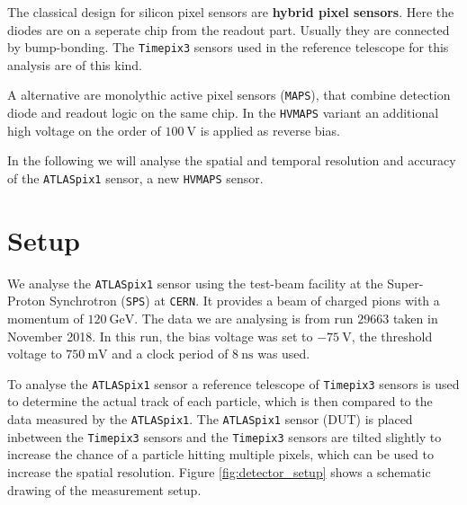 \documentclass[twocolumn,DIV=14,a4paper,biblatex, 10pt]{scrartcl}
\newcommand{\atlaspix}{\texttt{ATLASpix1}\xspace}
\newcommand{\timepix}{\texttt{Timepix3}\xspace}
\begin{document}
The classical design for silicon pixel sensors are \textbf{hybrid pixel sensors}. Here the diodes are on a seperate chip from the readout part. Usually they are connected by bump-bonding. The \timepix sensors used in the reference telescope for this analysis are of this kind.

A alternative are monolythic active pixel sensors (\texttt{MAPS}), that combine detection diode and readout logic on the same chip. In the \texttt{HVMAPS} variant an additional high voltage on the order of $\SI{100}{\volt}$ is applied as reverse bias.

In the following we will analyse the spatial and temporal resolution and accuracy of the \atlaspix sensor, a new \texttt{HVMAPS} sensor.
\section{Setup}
We analyse the \atlaspix sensor using the test-beam facility at the Super-Proton Synchrotron (\texttt{SPS}) at \texttt{CERN}. It provides a beam of charged pions with a momentum of $\SI{120}{\giga\electronvolt}$. The data we are analysing is from run $\num{29663}$ taken in November 2018. In this run, the bias voltage was set to $\SI{-75}{\volt}$, the threshold voltage to $\SI{750}{\milli\volt}$ and a clock period of $\SI{8}{\nano\second}$ was used.

To analyse the \atlaspix sensor a reference telescope of \timepix sensors is used to determine the actual track of each particle, which is then compared to the data measured by the \atlaspix. The \atlaspix sensor (DUT) is placed inbetween the \timepix sensors and the \timepix sensors are tilted slightly to increase the chance of a particle hitting multiple pixels, which can be used to increase the spatial resolution. Figure \ref{fig:detector_setup} shows a schematic drawing of the measurement setup.
\end{document}
